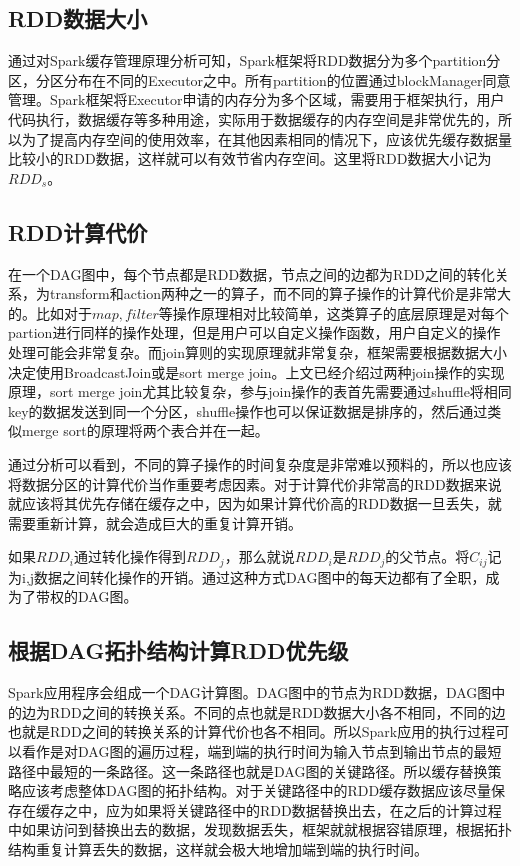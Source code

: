 \subsection{RDD数据大小}

通过对Spark缓存管理原理分析可知，Spark框架将RDD数据分为多个partition分区，分区分布在不同的Executor之中。所有partition的位置通过blockManager同意管理。Spark框架将Executor申请的内存分为多个区域，需要用于框架执行，用户代码执行，数据缓存等多种用途，实际用于数据缓存的内存空间是非常优先的，所以为了提高内存空间的使用效率，在其他因素相同的情况下，应该优先缓存数据量比较小的RDD数据，这样就可以有效节省内存空间。这里将RDD数据大小记为$RDD_s$。

\subsection{RDD计算代价}

在一个DAG图中，每个节点都是RDD数据，节点之间的边都为RDD之间的转化关系，为transform和action两种之一的算子，而不同的算子操作的计算代价是非常大的。比如对于$map,filter$等操作原理相对比较简单，这类算子的底层原理是对每个partion进行同样的操作处理，但是用户可以自定义操作函数，用户自定义的操作处理可能会非常复杂。而join算则的实现原理就非常复杂，框架需要根据数据大小决定使用BroadcastJoin或是sort merge join。上文已经介绍过两种join操作的实现原理，sort merge join尤其比较复杂，参与join操作的表首先需要通过shuffle将相同key的数据发送到同一个分区，shuffle操作也可以保证数据是排序的，然后通过类似merge sort的原理将两个表合并在一起。

通过分析可以看到，不同的算子操作的时间复杂度是非常难以预料的，所以也应该将数据分区的计算代价当作重要考虑因素。对于计算代价非常高的RDD数据来说就应该将其优先存储在缓存之中，因为如果计算代价高的RDD数据一旦丢失，就需要重新计算，就会造成巨大的重复计算开销。

如果$RDD_i$通过转化操作得到$RDD_j$，那么就说$RDD_i$是$RDD_j$的父节点。将$C_{ij}$记为i,j数据之间转化操作的开销。通过这种方式DAG图中的每天边都有了全职，成为了带权的DAG图。

\subsection{根据DAG拓扑结构计算RDD优先级}

Spark应用程序会组成一个DAG计算图。DAG图中的节点为RDD数据，DAG图中的边为RDD之间的转换关系。不同的点也就是RDD数据大小各不相同，不同的边也就是RDD之间的转换关系的计算代价也各不相同。所以Spark应用的执行过程可以看作是对DAG图的遍历过程，端到端的执行时间为输入节点到输出节点的最短路径中最短的一条路径。这一条路径也就是DAG图的关键路径。所以缓存替换策略应该考虑整体DAG图的拓扑结构。对于关键路径中的RDD缓存数据应该尽量保存在缓存之中，应为如果将关键路径中的RDD数据替换出去，在之后的计算过程中如果访问到替换出去的数据，发现数据丢失，框架就就根据容错原理，根据拓扑结构重复计算丢失的数据，这样就会极大地增加端到端的执行时间。

